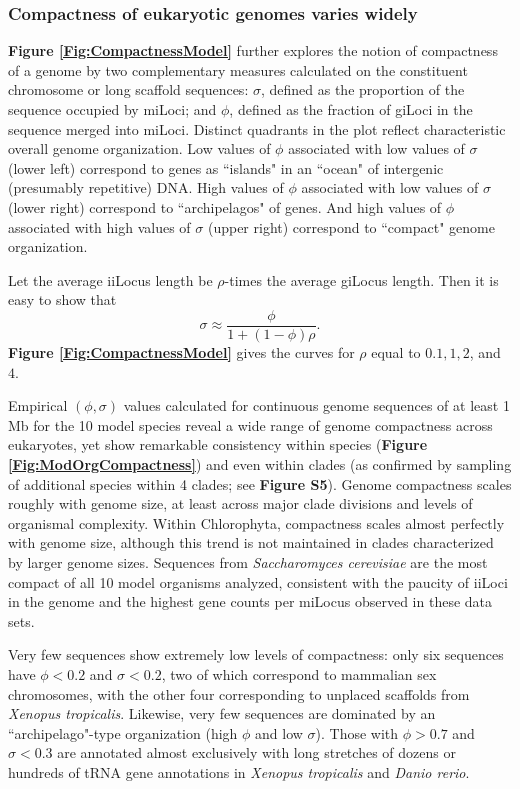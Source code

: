 \subsubsection{Compactness of eukaryotic genomes varies widely}

\textbf{Figure \ref{Fig:CompactnessModel}} further explores the notion of compactness of a genome by two complementary measures calculated on the constituent chromosome or long scaffold sequences:
$\sigma$, defined as the proportion of the sequence occupied by miLoci;
and $\phi$, defined as the fraction of giLoci in the sequence merged into miLoci.
Distinct quadrants in the plot reflect characteristic overall genome organization.
Low values of $\phi$ associated with low values of $\sigma$ (lower left) correspond to genes as ``islands" in an ``ocean" of intergenic (presumably repetitive) DNA.
High values of $\phi$ associated with low values of $\sigma$ (lower right) correspond to ``archipelagos" of genes.
And high values of $\phi$ associated with high values of $\sigma$ (upper right) correspond to ``compact" genome organization.

Let the average iiLocus length be $\rho$-times the average giLocus length.
Then it is easy to show that
$$\sigma \approx \frac{\phi}{1 + (1-\phi)\rho}.$$
\textbf{Figure \ref{Fig:CompactnessModel}} gives the curves for $\rho$ equal to $0.1, 1, 2$, and $4$.

Empirical $(\phi,\sigma)$ values calculated for continuous genome sequences of at least 1 Mb for the 10 model species reveal a wide range of genome compactness across eukaryotes, yet show remarkable consistency within species (\textbf{Figure \ref{Fig:ModOrgCompactness}}) and even within clades (as confirmed by sampling of additional species within 4 clades; see \textbf{Figure S5}).
Genome compactness scales roughly with genome size, at least across major clade divisions and levels of organismal complexity.
Within Chlorophyta, compactness scales almost perfectly with genome size, although this trend is not maintained in clades characterized by larger genome sizes.
Sequences from \textit{Saccharomyces cerevisiae} are the most compact of all 10 model organisms analyzed, consistent with the paucity of iiLoci in the genome and the highest gene counts per miLocus observed in these data sets.

Very few sequences show extremely low levels of compactness: only six sequences have $\phi < 0.2$ and $\sigma < 0.2$, two of which correspond to mammalian sex chromosomes, with the other four corresponding to unplaced scaffolds from \textit{Xenopus tropicalis}.
Likewise, very few sequences are dominated by an ``archipelago"-type organization (high $\phi$ and low $\sigma$).
Those with $\phi > 0.7$ and $\sigma < 0.3$ are annotated almost exclusively with long stretches of dozens or hundreds of tRNA gene annotations in \textit{Xenopus tropicalis} and \textit{Danio rerio}.

